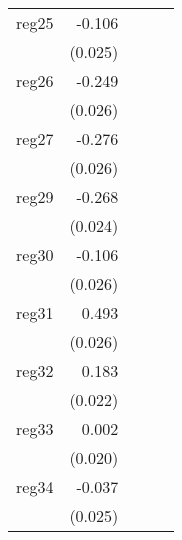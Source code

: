 {\begin{longtable}{l*{4}{D{.}{.}{-1}}}
\addlinespace
reg25       &      -0.106\sym{***}&                     &                     &                     \\
            &     (0.025)         &                     &                     &                     \\
\addlinespace
reg26       &      -0.249\sym{***}&                     &                     &                     \\
            &     (0.026)         &                     &                     &                     \\
\addlinespace
reg27       &      -0.276\sym{***}&                     &                     &                     \\
            &     (0.026)         &                     &                     &                     \\
\addlinespace
reg29       &      -0.268\sym{***}&                     &                     &                     \\
            &     (0.024)         &                     &                     &                     \\
\addlinespace
reg30       &      -0.106\sym{***}&                     &                     &                     \\
            &     (0.026)         &                     &                     &                     \\
\addlinespace
reg31       &       0.493\sym{***}&                     &                     &                     \\
            &     (0.026)         &                     &                     &                     \\
\addlinespace
reg32       &       0.183\sym{***}&                     &                     &                     \\
            &     (0.022)         &                     &                     &                     \\
\addlinespace
reg33       &       0.002         &                     &                     &                     \\
            &     (0.020)         &                     &                     &                     \\
\addlinespace
reg34       &      -0.037         &                     &                     &                     \\
            &     (0.025)         &                     &                     &                     \\

\end{longtable}}
